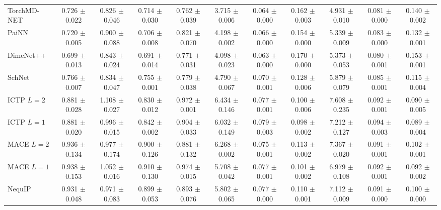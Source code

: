 \begin{table}[h]
{\begin{tabular}{lcccccccccc}
TorchMD-NET & 0.726 $\pm$ 0.022 & 0.826 $\pm$ 0.046 & 0.714 $\pm$ 0.030 & 0.762 $\pm$ 0.039 & 3.715 $\pm$ 0.006 & 0.064 $\pm$ 0.000 & 0.162 $\pm$ 0.003 & 4.931 $\pm$ 0.010 & 0.081 $\pm$ 0.000 & 0.140 $\pm$ 0.002 \\
PaiNN & 0.720 $\pm$ 0.005 & 0.900 $\pm$ 0.088 & 0.706 $\pm$ 0.008 & 0.821 $\pm$ 0.070 & 4.198 $\pm$ 0.002 & 0.066 $\pm$ 0.000 & 0.154 $\pm$ 0.000 & 5.339 $\pm$ 0.009 & 0.083 $\pm$ 0.000 & 0.132 $\pm$ 0.001 \\
DimeNet++ & 0.699 $\pm$ 0.013 & 0.843 $\pm$ 0.024 & 0.691 $\pm$ 0.014 & 0.771 $\pm$ 0.031 & 4.098 $\pm$ 0.023 & 0.063 $\pm$ 0.000 & 0.170 $\pm$ 0.000 & 5.373 $\pm$ 0.053 & 0.080 $\pm$ 0.001 & 0.153 $\pm$ 0.001 \\
SchNet & 0.766 $\pm$ 0.007 & 0.834 $\pm$ 0.047 & 0.755 $\pm$ 0.001 & 0.779 $\pm$ 0.038 & 4.790 $\pm$ 0.067 & 0.070 $\pm$ 0.001 & 0.128 $\pm$ 0.006 & 5.879 $\pm$ 0.079 & 0.085 $\pm$ 0.001 & 0.115 $\pm$ 0.004 \\
ICTP $L{=}2$ & 0.881 $\pm$ 0.028 & 1.108 $\pm$ 0.027 & 0.830 $\pm$ 0.012 & 0.972 $\pm$ 0.001 & 6.434 $\pm$ 0.146 & 0.077 $\pm$ 0.001 & 0.100 $\pm$ 0.006 & 7.608 $\pm$ 0.235 & 0.092 $\pm$ 0.001 & 0.090 $\pm$ 0.005 \\
ICTP $L{=}1$ & 0.881 $\pm$ 0.020 & 0.996 $\pm$ 0.015 & 0.842 $\pm$ 0.002 & 0.904 $\pm$ 0.033 & 6.032 $\pm$ 0.149 & 0.079 $\pm$ 0.003 & 0.098 $\pm$ 0.002 & 7.212 $\pm$ 0.127 & 0.094 $\pm$ 0.003 & 0.089 $\pm$ 0.004 \\
MACE $L{=}2$ & 0.936 $\pm$ 0.134 & 0.977 $\pm$ 0.174 & 0.900 $\pm$ 0.126 & 0.881 $\pm$ 0.132 & 6.268 $\pm$ 0.002 & 0.075 $\pm$ 0.001 & 0.113 $\pm$ 0.002 & 7.367 $\pm$ 0.020 & 0.091 $\pm$ 0.001 & 0.102 $\pm$ 0.001 \\
MACE $L{=}1$ & 0.938 $\pm$ 0.153 & 1.052 $\pm$ 0.016 & 0.910 $\pm$ 0.130 & 0.974 $\pm$ 0.015 & 5.708 $\pm$ 0.042 & 0.077 $\pm$ 0.001 & 0.101 $\pm$ 0.002 & 6.979 $\pm$ 0.108 & 0.092 $\pm$ 0.001 & 0.092 $\pm$ 0.002 \\
NequIP & 0.931 $\pm$ 0.048 & 0.971 $\pm$ 0.083 & 0.899 $\pm$ 0.053 & 0.893 $\pm$ 0.076 & 5.802 $\pm$ 0.065 & 0.077 $\pm$ 0.000 & 0.110 $\pm$ 0.001 & 7.112 $\pm$ 0.009 & 0.091 $\pm$ 0.000 & 0.100 $\pm$ 0.000 \\
\bottomrule
\end{tabular}%
}
 

\end{table}
